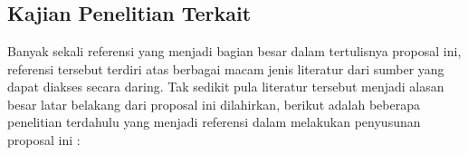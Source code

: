 \chapter{\babDua}

\section{Kajian Penelitian Terkait}
Banyak sekali referensi yang menjadi bagian besar dalam tertulisnya proposal ini, referensi tersebut terdiri atas berbagai macam jenis literatur dari sumber yang dapat diakses secara daring. Tak sedikit pula literatur tersebut menjadi alasan besar latar belakang dari proposal ini dilahirkan, berikut adalah beberapa penelitian terdahulu yang menjadi referensi dalam melakukan penyusunan proposal ini :

